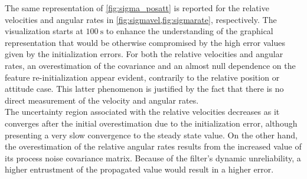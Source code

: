 The same representation of \cref{fig:sigma_posatt} is reported for the relative velocities and angular rates in \cref{fig:sigmavel,fig:sigmarate}, respectively. The visualization starts at $\SI{100}{\second}$ to enhance the understanding of the graphical representation that would be otherwise compromised by the high error values given by the initialization errors. For both the relative velocities and angular rates, an overestimation of the covariance and an almost null dependence on the feature re-initialization appear evident, contrarily to the relative position or attitude case. This latter phenomenon is justified by the fact that there is no direct measurement of the velocity and angular rates. \\
The uncertainty region associated with the relative velocities decreases as it converges after the initial overestimation due to the initialization error, although presenting a very slow convergence to the steady state value. On the other hand, the overestimation of the relative angular rates results from the increased value of its process noise covariance matrix. Because of the filter's dynamic unreliability, a higher entrustment of the propagated value would result in a higher error.  \newline
